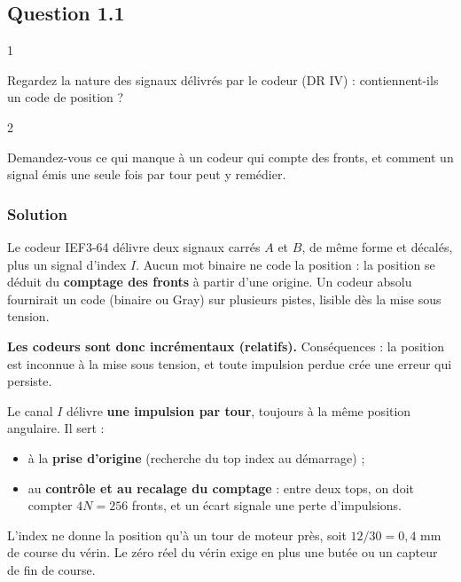 \documentclass[11pt,a4paper]{article}
\providecommand{\tightlist}{\setlength{\itemsep}{0pt}\setlength{\parskip}{0pt}}
\begin{document}
\hypertarget{question-1.1}{%
\subsection{Question 1.1}\label{question-1.1}}

\begin{indication}{1}

Regardez la nature des signaux délivrés par le codeur (DR IV) : contiennent-ils un code de position ?

\end{indication}

\begin{indication}{2}

Demandez-vous ce qui manque à un codeur qui compte des fronts, et comment un signal émis une seule fois par tour peut y remédier.

\end{indication}

\hypertarget{solution}{%
\subsubsection{Solution}\label{solution}}

Le codeur IEF3-64 délivre deux signaux carrés \(A\) et \(B\), de même forme et décalés, plus un signal d'index \(I\). Aucun mot binaire ne code la position : la position se déduit du \textbf{comptage des fronts} à partir d'une origine. Un codeur absolu fournirait un code (binaire ou Gray) sur plusieurs pistes, lisible dès la mise sous tension.

\textbf{Les codeurs sont donc incrémentaux (relatifs).} Conséquences : la position est inconnue à la mise sous tension, et toute impulsion perdue crée une erreur qui persiste.

Le canal \(I\) délivre \textbf{une impulsion par tour}, toujours à la même position angulaire. Il sert :

\begin{itemize}
\tightlist
\item
  à la \textbf{prise d'origine} (recherche du top index au démarrage) ;
\item
  au \textbf{contrôle et au recalage du comptage} : entre deux tops, on doit compter \(4N = 256\) fronts, et un écart signale une perte d'impulsions.
\end{itemize}

L'index ne donne la position qu'à un tour de moteur près, soit \(12/30 = 0{,}4\) mm de course du vérin. Le zéro réel du vérin exige en plus une butée ou un capteur de fin de course.
\end{document}
